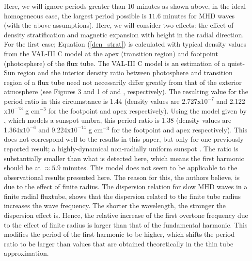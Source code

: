 	Here, we will ignore periods greater than $10$ minutes as shown above, in the ideal homogeneous case, the largest period possible is $11.6$ minutes for MHD waves (with the above assumptions).
	Here, we will consider two effects: the effect of density stratification and magnetic expansion with height in the radial direction.
	For the first case; Equation (\ref{den_strat}) is calculated with typical density values from the VAL-III C model \citet{1981ApJS...45..635V} at the apex (transition region) and footpoint (photosphere) of the flux tube.
	The VAL-III C model is an estimation of a quiet-Sun region and the interior density ratio between photosphere and transition region of a flux tube need not necessarily differ greatly from that of the exterior atmosphere (see Figures 3 and 1 of \citealp{GFME13a} and \citealp{GFE14}, respectively). 
	The resulting value for the period ratio in this circumstance is 1.44 (density values are 2.727$\mathrm{x}10^{-7}$ and 2.122$\mathrm{x}10^{-13}$ g cm$^{-3}$ for the footpoint and apex respectively).
	Using the model given by \citet{Maltby1986}, which models a sunspot umbra, this period ratio is 1.38 (density values are 1.364$\mathrm{x}10^{-6}$ and 9.224$\mathrm{x}10^{-14}$ g cm$^{-3}$ for the footpoint and apex respectively).
	This does not correspond well to the results in this paper, but only for one previously reported result; a highly-dynamical non-radially uniform sunspot \citep{Dorotovic2014}.
	The ratio is substantially smaller than what is detected here, which means the first harmonic should be at $\approx 5.9$ minutes.
	This model does not seem to be applicable to the observational results presented here. 
	The reason for this, the authors believe, is due to the effect of finite radius.
	The dispersion relation for slow MHD waves in a finite radial fluxtube, shows that the dispersion related to the finite tube radius increases the wave frequency.
	The shorter the wavelength, the stronger the dispersion effect is.
	Hence, the relative increase of the first overtone frequency due to the effect of finite radius is larger than that of the fundamental harmonic.
	This modifies the period of the first harmonic to be higher, which shifts the period ratio to be larger than values that are obtained theoretically in the thin tube approximation.
    
